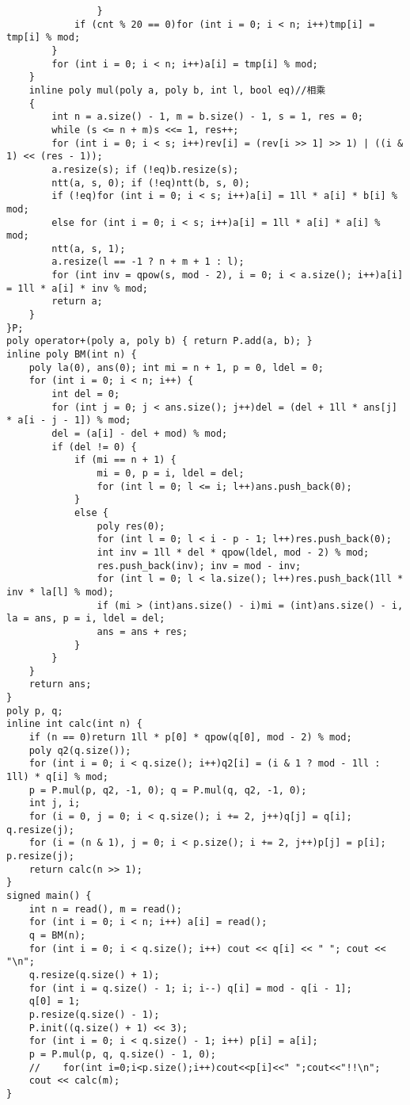 \begin{verbatim}
                }
            if (cnt % 20 == 0)for (int i = 0; i < n; i++)tmp[i] = tmp[i] % mod;
        }
        for (int i = 0; i < n; i++)a[i] = tmp[i] % mod;
    }
    inline poly mul(poly a, poly b, int l, bool eq)//相乘 
    {
        int n = a.size() - 1, m = b.size() - 1, s = 1, res = 0;
        while (s <= n + m)s <<= 1, res++;
        for (int i = 0; i < s; i++)rev[i] = (rev[i >> 1] >> 1) | ((i & 1) << (res - 1));
        a.resize(s); if (!eq)b.resize(s);
        ntt(a, s, 0); if (!eq)ntt(b, s, 0);
        if (!eq)for (int i = 0; i < s; i++)a[i] = 1ll * a[i] * b[i] % mod;
        else for (int i = 0; i < s; i++)a[i] = 1ll * a[i] * a[i] % mod;
        ntt(a, s, 1);
        a.resize(l == -1 ? n + m + 1 : l);
        for (int inv = qpow(s, mod - 2), i = 0; i < a.size(); i++)a[i] = 1ll * a[i] * inv % mod;
        return a;
    }
}P;
poly operator+(poly a, poly b) { return P.add(a, b); }
inline poly BM(int n) {
    poly la(0), ans(0); int mi = n + 1, p = 0, ldel = 0;
    for (int i = 0; i < n; i++) {
        int del = 0;
        for (int j = 0; j < ans.size(); j++)del = (del + 1ll * ans[j] * a[i - j - 1]) % mod;
        del = (a[i] - del + mod) % mod;
        if (del != 0) {
            if (mi == n + 1) {
                mi = 0, p = i, ldel = del;
                for (int l = 0; l <= i; l++)ans.push_back(0);
            }
            else {
                poly res(0);
                for (int l = 0; l < i - p - 1; l++)res.push_back(0);
                int inv = 1ll * del * qpow(ldel, mod - 2) % mod;
                res.push_back(inv); inv = mod - inv;
                for (int l = 0; l < la.size(); l++)res.push_back(1ll * inv * la[l] % mod);
                if (mi > (int)ans.size() - i)mi = (int)ans.size() - i, la = ans, p = i, ldel = del;
                ans = ans + res;
            }
        }
    }
    return ans;
}
poly p, q;
inline int calc(int n) {
    if (n == 0)return 1ll * p[0] * qpow(q[0], mod - 2) % mod;
    poly q2(q.size());
    for (int i = 0; i < q.size(); i++)q2[i] = (i & 1 ? mod - 1ll : 1ll) * q[i] % mod;
    p = P.mul(p, q2, -1, 0); q = P.mul(q, q2, -1, 0);
    int j, i;
    for (i = 0, j = 0; i < q.size(); i += 2, j++)q[j] = q[i]; q.resize(j);
    for (i = (n & 1), j = 0; i < p.size(); i += 2, j++)p[j] = p[i]; p.resize(j);
    return calc(n >> 1);
}
signed main() {
    int n = read(), m = read();
    for (int i = 0; i < n; i++) a[i] = read();
    q = BM(n);
    for (int i = 0; i < q.size(); i++) cout << q[i] << " "; cout << "\n";
    q.resize(q.size() + 1);
    for (int i = q.size() - 1; i; i--) q[i] = mod - q[i - 1];
    q[0] = 1;
    p.resize(q.size() - 1);
    P.init((q.size() + 1) << 3);
    for (int i = 0; i < q.size() - 1; i++) p[i] = a[i];
    p = P.mul(p, q, q.size() - 1, 0);
    //    for(int i=0;i<p.size();i++)cout<<p[i]<<" ";cout<<"!!\n";
    cout << calc(m);
}
\end{verbatim}

